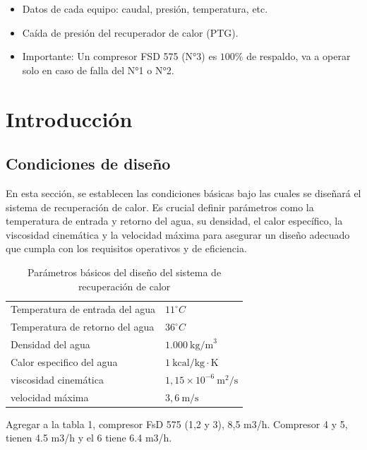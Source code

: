 \documentclass[11pt,a4paper]{article}  %
\begin{document}
\begin{itemize}
\item Datos de cada equipo: caudal, presión, temperatura, etc.
\item Caída de presión del recuperador de calor (PTG).
\item Importante: Un compresor FSD 575 (N°3) es $100\%$ de respaldo, va a operar solo en caso de falla del N°1 o N°2.
\end{itemize}


\section{Introducción}

\subsection{Condiciones de diseño}

En esta sección, se establecen las condiciones básicas bajo las cuales se diseñará el sistema de recuperación de calor. Es crucial definir parámetros como la temperatura de entrada y retorno del agua, su densidad, el calor específico, la viscosidad cinemática y la velocidad máxima para asegurar un diseño adecuado que cumpla con los requisitos operativos y de eficiencia.

\begin{table}[h!]
\centering
\begin{tabular}{ll}\toprule
Temperatura de entrada del agua & $11^\circ C$       \\
Temperatura de retorno del agua & $36^\circ C$        \\
Densidad del agua               & $1.000~\text{kg/m}^3$ \\
Calor especifico del agua       & $1~\text{kcal/kg}\cdot\text{K}$ \\
viscosidad cinemática           & $1,15\times 10^{-6}~\text{m}^2\text{/s}$            \\
velocidad máxima                & $3,6~\text{m/s}$  \\ \bottomrule  
\end{tabular}
\caption{Parámetros básicos del diseño del sistema de recuperación de calor}
\label{tab:condiciones}
\end{table}


Agregar a la tabla 1, compresor FsD 575 (1,2 y 3), 8,5 m3/h. Compresor 4 y 5, tienen 4.5 m3/h y el 6 tiene 6.4 m3/h.
\end{document}
